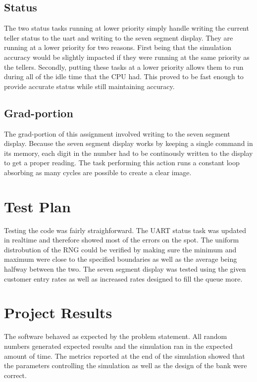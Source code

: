 \documentclass[CMPE]{KGCOEReport}
\begin{document}
	\subsection*{Status}

	The two status tasks running at lower priority simply handle writing the
	current teller status to the uart and writing to the seven segment display.
	They are running at a lower priority for two reasons. First being that the
	simulation accuracy would be slightly impacted if they were running at the
	same priority as the tellers. Secondly, putting these tasks at a lower
	priority allows them to run during all of the idle time that the CPU had.
	This proved to be fast enough to provide accurate status while still
	maintaining accuracy.

	\subsection*{Grad-portion}

	The grad-portion of this assignment involved writing to the seven segment
	display. Because the seven segment display works by keeping a single command
	in its memory, each digit in the number had to be continously written to the
	display to get a proper reading. The task performing this action runs a constant
	loop absorbing as many cycles are possible to create a clear image.

    \section*{Test Plan}

    Testing the code was fairly straighforward. The UART status task was updated
    in realtime and therefore showed most of the errors on the spot. The uniform
    distrobution of the RNG could be verified by making sure the minimum and maximum
    were close to the specified boundaries as well as the average being halfway between
    the two. The seven segment display was tested using the given customer entry rates
    as well as increased rates designed to fill the queue more.

    \section*{Project Results}

    The software behaved as expected by the problem statement. All random numbers
    generated expected results and the simulation ran in the expected amount of
    time. The metrics reported at the end of the simulation showed that the parameters
    controlling the simulation as well as the design of the bank were correct.
\end{document}
